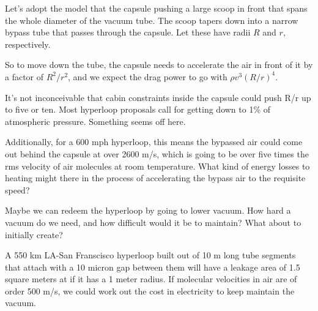 \documentclass[12pt]{article}
\begin{document}
Let's adopt the model that the capsule pushing a large scoop in front that spans the whole diameter of the vacuum tube. The scoop tapers down into a narrow bypass tube that passes through the capsule. Let these have radii \(R\) and \(r\), respectively.

So to move down the tube, the capsule needs to accelerate the air in front of it by a factor of \(R^2/r^2\), and we expect the drag power to go with \(\rho v^3(R/r)^4\). 

It's not inconceivable that cabin constraints inside the capsule could push R/r up to five or ten. Most hyperloop proposals call for getting down to 1\% of atmospheric pressure. Something seems off here.

Additionally, for a 600 mph hyperloop, this means the bypassed air could come out behind the capsule at over 2600 m/s, which is going to be over five times the rms velocity of air molecules at room temperature. What kind of energy losses to heating might there in the process of accelerating the bypass air to the requisite speed?

Maybe we can redeem the hyperloop by going to lower vacuum. How hard a vacuum do we need, and how difficult would it be to maintain? What about to initially create?

A 550 km LA-San Franscisco hyperloop built out of 10 m long tube segments that attach with a 10 micron gap between them will have a leakage area of 1.5 square meters at if it has a 1 meter radius. If molecular velocities in air are of order 500 m/s, we could work out the cost in electricity to keep maintain the vacuum. 
\end{document}

